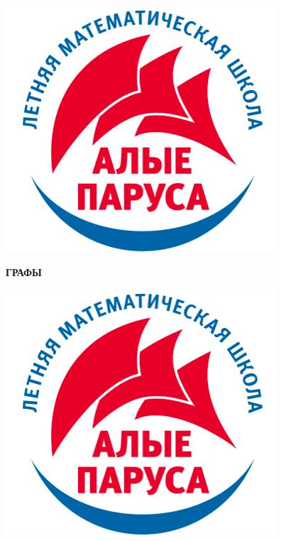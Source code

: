 \documentclass[12 pt, a4paper]{article}%
\begin{document}
	\newpage
	\begin{flushright}
	\end{flushright}
	\begin{figure}[t]
		\begin{minipage}[h]{0.33\linewidth}
			\includegraphics[width=0.33\linewidth, left]{logo.jpg}
		\end{minipage}
		\begin{minipage}[h]{0.33\linewidth}
			\centering
			\large{\textbf{ГРАФЫ}}\\
		\end{minipage}
		\begin{minipage}[h]{0.33\linewidth}
			\includegraphics[width=0.33\linewidth, right]{logo.jpg}
		\end{minipage}
		\label{ris:image1}
	\end{figure}
	
\end{document}
